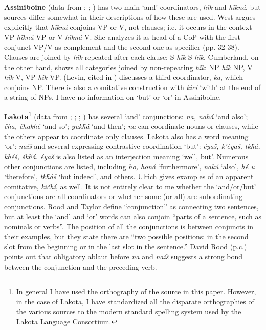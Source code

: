 \documentclass[output=paper]{LSP/langsci}
\begin{document}
\textbf{Assiniboine} (data from \citealt{West2003}; \citealt{Cumberland2005}; \citealt{Levin1964}) has two main `and' coordinators, \textit{h\~ik} and \textit{h\~ikná}, but sources differ somewhat in their descriptions of how these are used. West argues explicitly that \textit{h\~ikná} conjoins VP or V, not clauses; i.e. it occurs in the context VP \textit{h\~ikná} VP or V \textit{h\~ikná} V. She analyzes it as head of a CoP with the first conjunct VP/V as complement and the second one as specifier (pp. 32-38). Clauses are joined by \textit{h\~ik} repeated after each clause: S \textit{h\~ik} S \textit{h\~ik}. Cumberland, on the other hand, shows all categories joined by non-repeating \textit{h\~ik}: NP \textit{h\~ik} NP, V \textit{h\~ik} V, VP \textit{h\~ik} VP. (Levin, cited in \citealt[36]{Stassen2000}) discusses a third coordinator, \textit{ka}, which conjoins NP. There is also a comitative construction with \textit{kici} `with' at the end of a string of NPs. I have no information on `but' or `or' in Assiniboine.

\textbf{Lakota}\footnote{In general I have used the orthography of the source in this paper. However, in the case of Lakota, I have standardized all the disparate orthographies of the various sources to the modern standard spelling system used by the Lakota Language Consortium.} (data from  \citealt{RoodTaylor1996}; \citealt{Ingham2003}; \citealt{Ullrich2016};  \citealt{BoasDeloria1941}) has several `and' conjunctions: \textit{na, nahá} `and also'; \textit{\v{c}ha, \v{c}hakhé} `and so'; \textit{yuk\v{h}á} `and then'; \textit{na} can coordinate nouns or clauses, while the others appear to coordinate only clauses. Lakota also has a word meaning `or': \textit{naí\v{s}} and several expressing contrastive coordination `but': \textit{éya\v{s}, k'éya\v{s}, tk\v{h}á, khé\v{s}, \v{s}k\v{h}á. éya\v{s}} is also listed as an interjection meaning `well, but'. Numerous other conjunctions are listed, including \textit{ho, honá} `furthermore', \textit{nakú} `also', \textit{hé u} `therefore', \textit{tk\v{h}á\v{s}} `but indeed', and others. Ulrich gives examples of an apparent comitative, \textit{ki\v{c}hí}, as well. It is not entirely clear to me whether the `and/or/but' conjunctions are all coordinators or whether some (or all) are subordinating conjunctions. Rood and Taylor define ``conjunction'' as connecting two sentences, but at least the `and' and `or' words can also conjoin ``parts of a sentence, such as nominals or verbs''. The position of all the conjunctions is between conjuncts in their examples, but they state there are ``two possible positions: in the second slot from the beginning or in the last slot in the sentence.'' David Rood (p.c.) points out that obligatory ablaut before \textit{na} and \textit{naí\v{s}} suggests a strong bond between the conjunction and the preceding verb.
\end{document}
